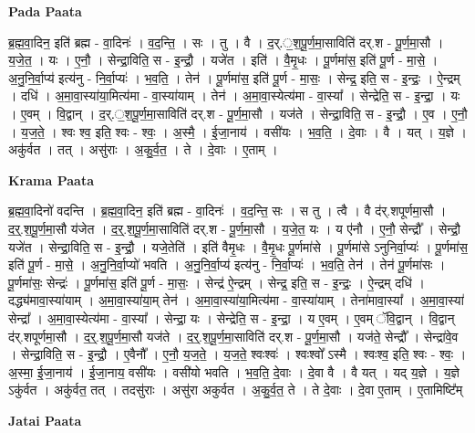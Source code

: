 \documentclass[17pt]{extarticle}
\begin{document}
\textbf{Pada Paata} \newline

ब्र॒ह्म॒वा॒दिन॒ इति॑ ब्रह्म - वा॒दिनः॑ । व॒द॒न्ति॒ । सः । तु । वै । द॒र्.॒श॒पू॒र्ण॒मा॒साविति॑ दर्.श - पू॒र्ण॒मा॒सौ । य॒जे॒त॒ । यः । ए॒नौ॒ । सेन्द्रा॒विति॒ स - इ॒न्द्रौ॒ । यजे॑त । इति॑ । वै॒मृ॒धः । पू॒र्णमा॑स॒ इति॑ पू॒र्ण - मा॒से॒ । अ॒नु॒नि॒र्वा॒प्य॑ इत्य॑नु - नि॒र्वा॒प्यः॑ । भ॒व॒ति॒ । तेन॑ । पू॒र्णमा॑स॒ इति॑ पू॒र्ण - मा॒सः॒ । सेन्द्र॒ इति॒ स - इ॒न्द्रः॒ । ऐ॒न्द्रम् । दधि॑ । अ॒मा॒वा॒स्या॑या॒मित्य॑मा - वा॒स्या॑याम् । तेन॑ । अ॒मा॒वा॒स्येत्य॑मा - वा॒स्या᳚ । सेन्द्रेति॒ स - इ॒न्द्रा॒ । यः । ए॒वम् । वि॒द्वान् । द॒र्.॒श॒पू॒र्ण॒मा॒साविति॑ दर्.श - पू॒र्ण॒मा॒सौ । यज॑ते । सेन्द्रा॒विति॒ स - इ॒न्द्रौ॒ । ए॒व । ए॒नौ॒ । य॒ज॒ते॒ । श्वः श्व॒ इति॒ श्वः - श्वः॒ । अ॒स्मै॒ । ई॒जा॒नाय॑ । वसी॑यः । भ॒व॒ति॒ । दे॒वाः । वै । यत् । य॒ज्ञे । अकु॑र्वत । तत् । असु॑राः । अ॒कु॒र्व॒त॒ । ते । दे॒वाः । ए॒ताम् ।  \newline


\textbf{Krama Paata} \newline

ब्र॒ह्म॒वा॒दिनो॑ वदन्ति । ब्र॒ह्म॒वा॒दिन॒ इति॑ ब्रह्म - वा॒दिनः॑ । व॒द॒न्ति॒ सः । स तु । त्वै । 
वै द॑र्.शपूर्णमा॒सौ । द॒र्॒.श॒पू॒र्ण॒मा॒सौ य॑जेत । द॒र्॒.श॒पू॒र्ण॒मा॒साविति॑ दर्.श - पू॒र्ण॒मा॒सौ । य॒जे॒त॒ यः । य ए॑नौ । ए॒नौ॒ सेन्द्रौ᳚ । सेन्द्रौ॒ यजे॑त । सेन्द्रा॒विति॒ स - इ॒न्द्रौ॒ । यजे॒तेति॑ । इति॑ वैमृ॒धः । वै॒मृ॒धः पू॒र्णमा॑से । पू॒र्णमा॑से ऽनुनिर्वा॒प्यः॑ । पू॒र्णमा॑स॒ इति॑ पू॒र्ण - मा॒से॒ । अ॒नु॒नि॒र्वा॒प्यो॑ भवति । अ॒नु॒नि॒र्वा॒प्य॑ इत्य॑नु - नि॒र्वा॒प्यः॑ । भ॒व॒ति॒ तेन॑ । तेन॑ पू॒र्णमा॑सः । पू॒र्णमा॑सः॒ सेन्द्रः॑ । पू॒र्णमा॑स॒ इति॑ पू॒र्ण - मा॒सः॒ । सेन्द्र॑ ऐ॒न्द्रम् । सेन्द्र॒ इति॒ स - इ॒न्द्रः॒ । ऐ॒न्द्रम् दधि॑ । दद्ध्य॑मावा॒स्या॑याम् । अ॒मा॒वा॒स्या॑या॒म् तेन॑ । अ॒मा॒वा॒स्या॑या॒मित्य॑मा - वा॒स्या॑याम् । तेना॑मावा॒स्या᳚ । अ॒मा॒वा॒स्या॑ सेन्द्रा᳚ । अ॒मा॒वा॒स्येत्य॑मा - वा॒स्या᳚ । सेन्द्रा॒ यः । सेन्द्रेति॒ स - इ॒न्द्रा॒ । य ए॒वम् । ए॒वम् ॅवि॒द्वान् । वि॒द्वान् द॑र्.शपूर्णमा॒सौ । द॒र्॒.श॒पू॒र्ण॒मा॒सौ यज॑ते । द॒र्॒.श॒पू॒र्ण॒मा॒साविति॑ दर्.श - पू॒र्ण॒मा॒सौ । यज॑ते॒ सेन्द्रौ᳚ । सेन्द्रा॑वे॒व । सेन्द्रा॒विति॒ स - इ॒न्द्रौ॒ । ए॒वैनौ᳚ । ए॒नौ॒ य॒ज॒ते॒ । य॒ज॒ते॒ श्वःश्वः॑ । श्वःश्वो᳚ ऽस्मै । श्वःश्व॒ इति॒ श्वः - श्वः॒ । अ॒स्मा॒ ई॒जा॒नाय॑ । ई॒जा॒नाय॒ वसी॑यः । वसी॑यो भवति । भ॒व॒ति॒ दे॒वाः । दे॒वा वै । वै यत् । यद् य॒ज्ञे । य॒ज्ञे ऽकु॑र्वत । अकु॑र्वत॒ तत् । तदसु॑राः । असु॑रा अकुर्वत । अ॒कु॒र्व॒त॒ ते । ते दे॒वाः । दे॒वा ए॒ताम् । ए॒तामिष्टि᳚म् \newline

\textbf{Jatai Paata} \newline
\end{document}
